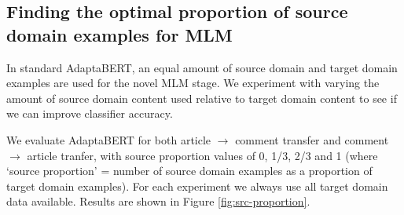 \subsection{Finding the optimal proportion of source domain examples for MLM} \label{subsec:src-proportion-adaptabert}

In standard AdaptaBERT, an equal amount of source domain and target domain examples are used for the novel MLM stage. We experiment with varying the amount of source domain content used relative to target domain content to see if we can improve classifier accuracy.

We evaluate AdaptaBERT for both article $ \rightarrow $ comment transfer and comment $ \rightarrow $ article tranfer, with source proportion values of 0, 1/3, 2/3 and 1 (where `source proportion' = number of source domain examples as a proportion of target domain examples). For each experiment we always use all target domain data available. Results are shown in Figure \ref{fig:src-proportion}.

